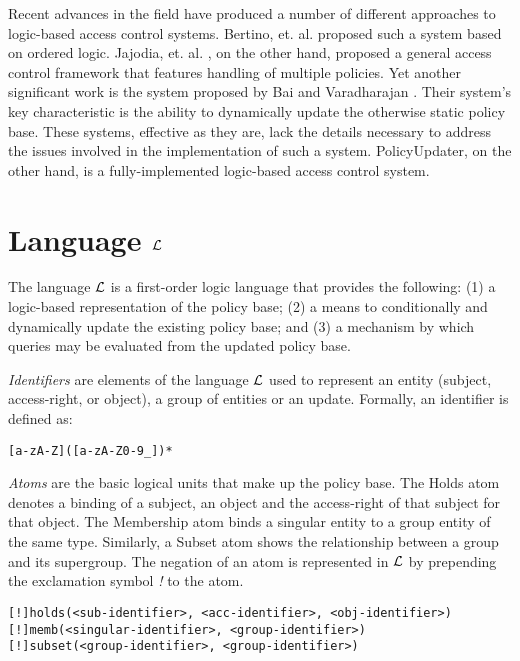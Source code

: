 \documentclass{llncs}
\begin{document}
    Recent advances in the field have produced a number of different approaches
    to logic-based access control systems. Bertino, et. al. \cite{BER} proposed
    such a system based on ordered logic. Jajodia, et. al. \cite{JAJ}, on the 
    other hand, proposed a general access control framework that features
    handling of multiple policies. Yet another significant work is the
    system proposed by Bai and Varadharajan \cite{BAI}. Their system's key
    characteristic is the ability to dynamically update the otherwise static
    policy base. These systems, effective as they are, lack the details
    necessary to address the issues involved in the implementation of such
    a system. PolicyUpdater, on the other hand, is a fully-implemented
    logic-based access control system.

  \section{Language $\cal{L}$}

    The language $\cal{L}$ is a first-order logic language that provides the
    following:  (1) a logic-based representation of the policy base; (2) a
    means to conditionally and dynamically update the existing policy base;
    and (3) a mechanism by which queries may be evaluated from the updated
    policy base.

    \emph{Identifiers} are elements of the language $\cal{L}$ used to represent
    an entity (subject, access-right, or object), a group of entities or an
    update. Formally, an identifier is defined as:

    \begin{verbatim}[a-zA-Z]([a-zA-Z0-9_])*\end{verbatim}

    \emph{Atoms} are the basic logical units that make up the policy base.
    The Holds atom denotes a binding of a subject, an object and the
    access-right of that subject for that object. The Membership atom binds
    a singular entity to a group entity of the same type. Similarly, a Subset
    atom shows the relationship between a group and its supergroup. The
    negation of an atom is represented in $\cal{L}$ by prepending the 
    exclamation symbol \emph{!} to the atom.

    \begin{verbatim}[!]holds(<sub-identifier>, <acc-identifier>, <obj-identifier>)
[!]memb(<singular-identifier>, <group-identifier>)
[!]subset(<group-identifier>, <group-identifier>)\end{verbatim}
\end{document}
